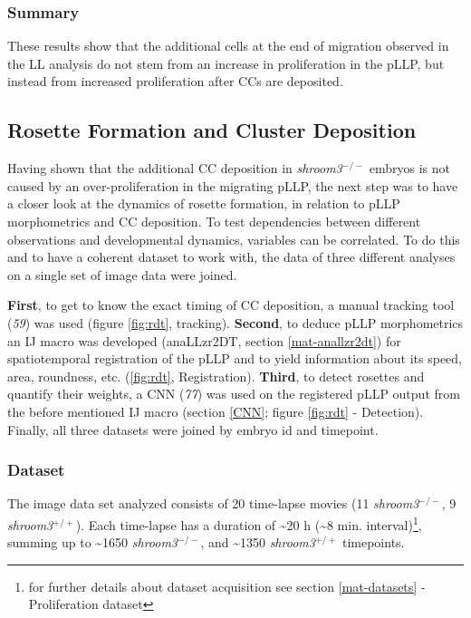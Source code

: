 \documentclass[11pt,singlespacinge,twoside]{reedthesis} %
\theoremstyle{definition}
\theoremstyle{definition}
\theoremstyle{definition}
\theoremstyle{remark}
\begin{document}
\hypertarget{summary-3}{%
\subsubsection{Summary}\label{summary-3}}

These results show that the additional cells at the end of migration observed in the LL analysis do not stem from an increase in proliferation in the pLLP, but instead from increased proliferation after CCs are deposited.

\hypertarget{rosette-formation-and-cluster-deposition}{%
\subsection{Rosette Formation and Cluster Deposition}\label{rosette-formation-and-cluster-deposition}}

Having shown that the additional CC deposition in \emph{shroom3}\(^{-/-}\) embryos is not caused by an over-proliferation in the migrating pLLP, the next step was to have a closer look at the dynamics of rosette formation, in relation to pLLP morphometrics and CC deposition. To test dependencies between different observations and developmental dynamics, variables can be correlated. To do this and to have a coherent dataset to work with, the data of three different analyses on a single set of image data were joined.

\textbf{First}, to get to know the exact timing of CC deposition, a manual tracking tool (\emph{59}) was used (figure \ref{fig:rdt}, tracking). \textbf{Second}, to deduce pLLP morphometrics an IJ macro was developed (anaLLzr2DT, section \ref{mat-anallzr2dt}) for spatiotemporal registration of the pLLP and to yield information about its speed, area, roundness, etc. (\ref{fig:rdt}, Registration). \textbf{Third}, to detect rosettes and quantify their weights, a CNN (\emph{77}) was used on the registered pLLP output from the before mentioned IJ macro (section \ref{CNN}; figure \ref{fig:rdt} - Detection).
Finally, all three datasets were joined by embryo id and timepoint.

\hypertarget{res-det-ds}{%
\subsubsection{Dataset}\label{res-det-ds}}

The image data set analyzed consists of 20 time-lapse movies (11 \emph{shroom3}\(^{-/-}\), 9 \emph{shroom3}\(^{+/+}\)). Each time-lapse has a duration of \textasciitilde20 h (\textasciitilde8 min. interval)\footnote{for further details about dataset acquisition see section \ref{mat-datasets} - Proliferation dataset}, summing up to \textasciitilde1650 \emph{shroom3}\(^{-/-}\), and \textasciitilde1350 \emph{shroom3}\(^{+/+}\) timepoints.
\end{document}

